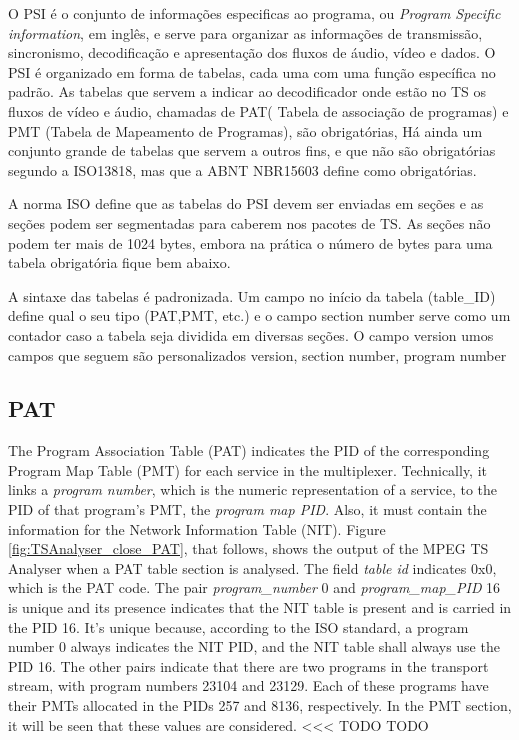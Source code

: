\documentclass[
	12pt,				%
	openright,			%
	twoside,			%
	a4paper,			%
	brazil,
	french,				%
	english
	]{abntex2}
\begin{document}
O PSI é o conjunto de informações especificas ao programa, ou \textit{Program Specific information}, em inglês,
e serve para organizar as informações de transmissão, sincronismo, decodificação e apresentação dos
fluxos de áudio, vídeo e dados. O PSI é organizado em forma de tabelas, cada uma com uma função específica no
padrão. As tabelas que servem a indicar ao decodificador onde estão no TS os fluxos de vídeo e áudio, chamadas
de PAT( Tabela de associação de programas) e PMT (Tabela de Mapeamento de Programas), são obrigatórias,
Há ainda um conjunto grande de tabelas que servem a outros fins, e que não são obrigatórias segundo a ISO13818,
mas que a ABNT NBR15603 define como obrigatórias.

A norma ISO define que as tabelas do PSI devem ser enviadas em seções e as seções podem ser segmentadas para
caberem nos pacotes de TS. As seções não podem ter mais de 1024 bytes, embora na prática o número de bytes 
para uma tabela obrigatória fique bem abaixo.

A sintaxe das tabelas é padronizada. Um campo no início da tabela (table\_ID) define qual o seu tipo
(PAT,PMT, etc.) e o campo section number serve como um contador caso a tabela seja dividida em diversas
seções. O campo version umos campos que seguem são personalizados version, section number, program number 

\subsection{PAT}

The Program Association Table (PAT) indicates the PID of the corresponding Program Map Table (PMT) for each service in the multiplexer. Technically, it links a \textit{program number}, which is the numeric representation of a service, to the PID of that program's PMT, the \textit{program map PID}. Also, it must contain the information for the Network Information Table (NIT). Figure \ref{fig:TSAnalyser_close_PAT}, that follows, shows the output of the MPEG TS Analyser when a PAT table section is analysed. The field \textit{table id} indicates 0x0, which is the PAT code. The pair \textit{program\_number} 0 and \textit{program\_map\_PID} 16 is unique and its presence indicates that the NIT table is present and is carried in the PID 16. It's unique because, according to the ISO standard, a program number 0 always indicates the NIT PID, and the NIT table shall always use the PID 16. The other pairs indicate that there are two programs in the transport stream, with program numbers 23104 and 23129. Each of these programs have their PMTs allocated in the PIDs 257 and 8136, respectively. In the PMT section, it will be seen that these values are considered. <<< TODO TODO
\end{document}
